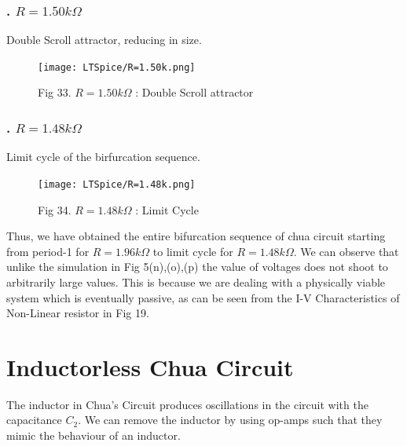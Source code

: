 \documentclass[12pt]{article}
\begin{document}
\subsubsection*{. $R=1.50k\Omega$}
Double Scroll attractor, reducing in size.
\begin{figure}[H] %
	\centering
	\texttt{[image: LTSpice/R=1.50k.png]}
	\caption{Fig 33. $R=1.50k\Omega$ : Double Scroll attractor}
\end{figure}
\subsubsection*{. $R=1.48k\Omega$}
Limit cycle of the birfurcation sequence.
\begin{figure}[H] %
	\centering
	\texttt{[image: LTSpice/R=1.48k.png]}
	\caption{Fig 34. $R=1.48k\Omega$ : Limit Cycle}
\end{figure}
Thus, we have obtained the entire bifurcation sequence of chua circuit starting from period-1 for $R=1.96k\Omega$ to limit cycle for $R=1.48k\Omega$. We can observe that unlike the simulation in Fig 5(n),(o),(p) the value of voltages does not shoot to arbitrarily large values. This is because we are dealing with a physically viable system which is eventually passive, as can be seen from the I-V Characteristics of Non-Linear resistor in Fig 19. 
\section{Inductorless Chua Circuit}
The inductor in Chua's Circuit produces oscillations in the circuit with the capacitance $C_2$. We can remove the inductor by using op-amps such that they mimic the behaviour of an inductor.
\end{document}
